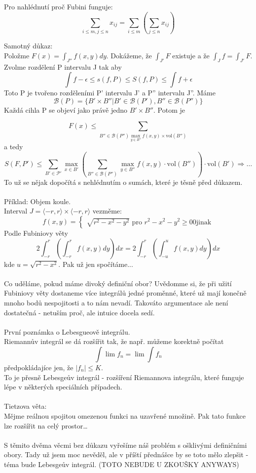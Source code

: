 \documentclass{article}
\begin{document}
Pro nahlédnutí proč Fubini funguje:
$$\sum_{i\leq m, j \leq n}x_{ij} = \sum_{i\leq m}(\sum_{j\leq n} x_{ij})$$

Samotný důkaz:\\
Položme $F(x) = \int_{J''}f(x,y)dy$. Dokážeme, že $\int_{J'}F$ existuje a že $\int_{J}f = \int_{J'}F$. Zvolme rozdělení P intervalu J tak aby
$$\int f - \epsilon \leq s(f,P) \leq S(f,P) \leq \int f + \epsilon$$
Toto P je tvořeno rozděleními P' intervalu J' a P'' intervalu J''. Máme 
$$\mathcal{B}(P) = \{ B' \times B'' | B' \in \mathcal{B}(P'), B'' \in \mathcal{B}(P'')\}$$
Každá cihla P se objeví jako právě jedno $B' \times B''$. Potom je

$$F(x) \leq \sum_{B'' \in \mathcal{B}(P'') \max_{y \in B''} f(x,y) \times \text{vol}(B'')}$$
a tedy
$$S(F,P') \leq \sum_{B' \in \mathcal{P'}} \max_{x \in B'}(\sum_{B'' \in \mathcal{B}(P'')}\max_{y \in B''}f(x,y) \cdot \text{vol}(B'')) \cdot \text{vol}(B') \Rightarrow \dots$$
To už se nějak dopočítá s nehlédnutím o sumách, které je těsně před důkazem.\\\\

Příklad: Objem koule.\\
Interval $J = \langle -r, r \rangle \times \langle -r, r \rangle $ vezměme:
$$f(x,y) = \begin{cases}
    \sqrt{r^{2} - x^{2} - y^{2}} \text{ pro }  r^{2}-x^{2}-y^{2} \geq 0
    0 \text{jinak}
\end{cases}$$
Podle Fubiniovy věty
$$2 \int_{-r}^{r}(\int_{-r}^{r}f(x,y)dy)dx = 2 \int_{-r}^{r}(\int_{-u}^{u}f(x,y)dy)dx$$ kde $u = \sqrt{r^{2} - x^{2}}$. Pak už jen spočítáme...\\\\


Co uděláme, pokud máme divoký definiční obor? Uvědomme si, že při užití Fubiniovy věty dostaneme více integrálů jedné proměnné, které už mají konečně mnoho bodů nespojitosti a to nám nevadí.
Takováto argumentace ale není dostatečná - netuším proč, ale intuice docela sedí.\\\\

První poznámka o Lebesgueově integrálu.\\
Riemannův integrál se dá rozšířit tak, že např. můžeme korektně počítat
$$\int  \lim f_{n} = \lim \int f_{n}$$
předpokládajíce jen, že $|f_{n}| \leq K$.\\
To je přesně Lebesgeův integrál - rozšíření Riemannova integrálu, které funguje lépe v některých speciálních případech.\\\\

Tietzova věta:\\
Mějme reálnou spojitou omezenou funkci na uzavřené množině. Pak tato funkce lze rozšířit na celý prostor\dots \\\\

S těmito dvěma věcmi bez důkazu vyřešíme náš problém s ošklivými definičními obory. Tady už jsem moc nevěděl, ale v příští přednášce by se toto mělo zlepšit - téma bude Lebesgeův integrál.
(TOTO NEBUDE U ZKOUŠKY ANYWAYS)
\end{document}
